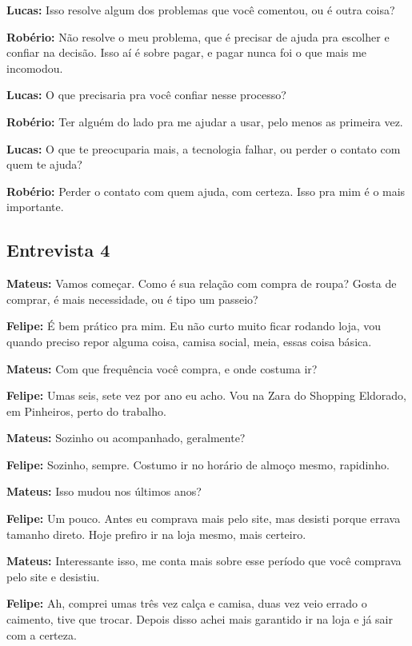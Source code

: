 \textbf{Lucas:} Isso resolve algum dos problemas que você comentou, ou é outra coisa?

\textbf{Robério:} Não resolve o meu problema, que é precisar de ajuda pra escolher e confiar na decisão. Isso aí é sobre pagar, e pagar nunca foi o que mais me incomodou.

\textbf{Lucas:} O que precisaria pra você confiar nesse processo?

\textbf{Robério:} Ter alguém do lado pra me ajudar a usar, pelo menos as primeira vez.

\textbf{Lucas:} O que te preocuparia mais, a tecnologia falhar, ou perder o contato com quem te ajuda?

\textbf{Robério:} Perder o contato com quem ajuda, com certeza. Isso pra mim é o mais importante.


\subsection*{Entrevista 4}

\textbf{Mateus:} Vamos começar. Como é sua relação com compra de roupa? Gosta de comprar, é mais necessidade, ou é tipo um passeio?

\textbf{Felipe:} É bem prático pra mim. Eu não curto muito ficar rodando loja, vou quando preciso repor alguma coisa, camisa social, meia, essas coisa básica.

\textbf{Mateus:} Com que frequência você compra, e onde costuma ir?

\textbf{Felipe:} Umas seis, sete vez por ano eu acho. Vou na Zara do Shopping Eldorado, em Pinheiros, perto do trabalho.

\textbf{Mateus:} Sozinho ou acompanhado, geralmente?

\textbf{Felipe:} Sozinho, sempre. Costumo ir no horário de almoço mesmo, rapidinho.

\textbf{Mateus:} Isso mudou nos últimos anos?

\textbf{Felipe:} Um pouco. Antes eu comprava mais pelo site, mas desisti porque errava tamanho direto. Hoje prefiro ir na loja mesmo, mais certeiro.

\textbf{Mateus:} Interessante isso, me conta mais sobre esse período que você comprava pelo site e desistiu.

\textbf{Felipe:} Ah, comprei umas três vez calça e camisa, duas vez veio errado o caimento, tive que trocar. Depois disso achei mais garantido ir na loja e já sair com a certeza.

